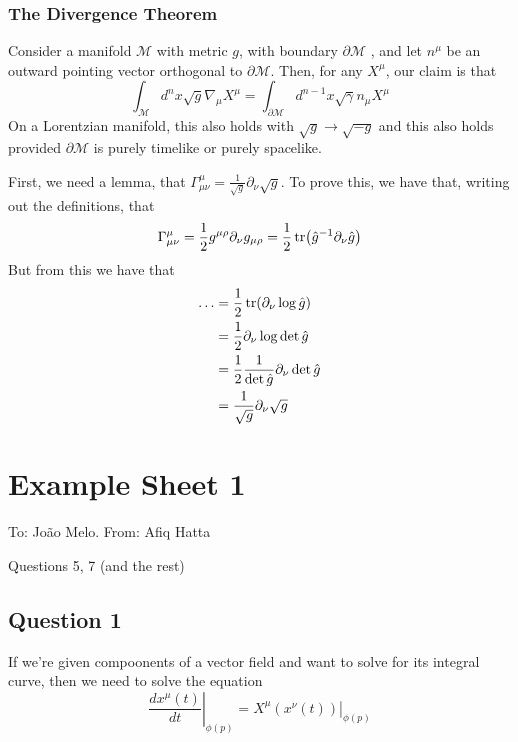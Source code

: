 \documentclass[11pt, a4paper]{article}   	%
\theoremstyle{slplain}
\begin{document}
\subsubsection{The Divergence Theorem} 
Consider a manifold $ \mathcal{ M } $ with 
metric $ g $, with 
boundary $ \partial  \mathcal{ M } $ , and
let $ n ^ \mu $ be an outward pointing 
vector orthogonal to $ \partial  \mathcal{ M } $. 
Then, for any $  X^ \mu $, our claim is that 
\[
 \int_{ \mathcal{ M } } d^ n x \sqrt{ g }  \nabla _ \mu X^ \mu = \int _{ \partial  \mathcal{ M } } d^{ n - 1} x \sqrt{ \gamma }  n_\mu 	 X ^ \mu 
\]   On a Lorentzian manifold, this also holds 
with $ \sqrt{ g  }  \to \sqrt{  - g}   $ and this 
also holds provided $ \partial   \mathcal{ M } $ is 
purely timelike or purely spacelike. 

First, we need a lemma, that $ \Gamma^{ \mu } _{ \mu \nu }  = \frac{1}{ \sqrt{ g }  } \partial_\nu \sqrt{ g } $. To prove this, we have that, writing out 
the definitions, that 
\[
	\Gamma ^ \mu _{ \mu \nu }  = \frac{1}{ 2  } g ^{ \mu \rho } \partial  _ \nu g _{ \mu \rho } = \frac{1}{2 }\tr ( \hat{ g } ^{ - 1 } \partial  _ \nu \hat{ g } ) 
\] But from this we have that 
\begin{align*}
	\dots &= \frac{1}{2 } \tr ( \partial  _\nu \log \hat{ g } )    \\
	      &=  \frac{1}{2 } \partial  _ \nu \log \det \hat{ g }  \\
	      &=  \frac{1}{2 } \frac{1}{ \det \hat{ g } } \partial  _ \nu \det \hat{ g }  \\
	      &=  \frac{1}{ \sqrt{ g } } \partial _ \nu \sqrt{ g }  	
\end{align*}

\pagebreak 
\section{Example Sheet 1} 
To: João Melo. 
From: Afiq Hatta

Questions 5, 7 (and the rest) 
\pagebreak 
\subsection{Question 1} 
If we're given compoonents of a vector field and want to solve for its integral curve, then we need to solve the equation
\[ 
\left. \frac{ d x^\mu(t) }{ dt} \right\vert_{\phi(p)} = \left. X^\mu( x^\nu(t) ) \right\vert_{ \phi( p)}
\] 
\end{document}
